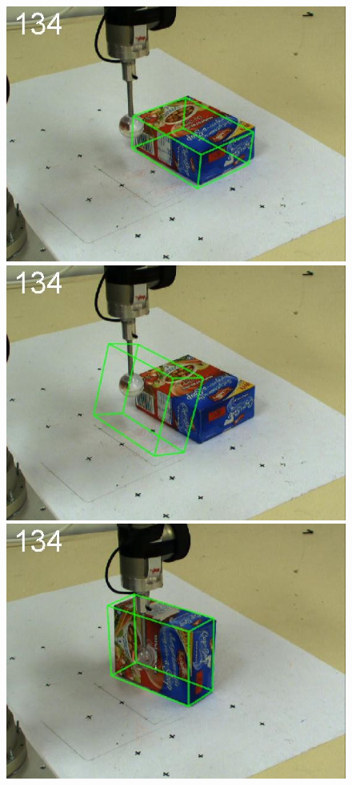 \begin{figure}[htbp]
{\includegraphics[width=\imgAXwid]{images/A2_2exp_399_3}
\includegraphics[width=\imgAXwid]{images/A2_LWPR1_399_3}
\includegraphics[width=\imgAXwid]{images/A2_2exp_87_3}
}
\end{figure}
